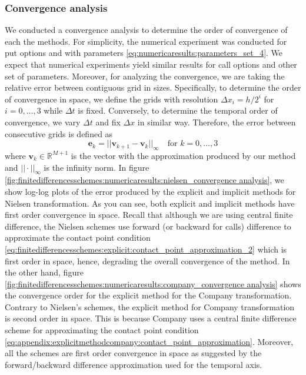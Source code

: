 \subsubsection{Convergence analysis}

We conducted a convergence analysis to determine the order of convergence of each the methods. For simplicity, the numerical experiment was conducted for put options and with parameters \eqref{eq:numericaresults:parameters_set_4}. We expect that numerical experiments yield similar results for call options and other set of parameters. Moreover, for analyzing the convergence, we are taking the relative error between contiguous grid in sizes. Specifically, to determine the order of convergence in space, we define the grids with resolution $\Delta{x}_i=h/2^i$ for $i=0,\dots,3$ while $\Delta{t}$ is fixed. Conversely, to determine the temporal order of convergence, we vary $\Delta{t}$ and fix $\Delta{x}$ in similar way. Therefore, the error between consecutive grids is defined as
\begin{equation}
  \mathbf{e}_k = ||\mathbf{v}_{k+1} - \mathbf{v}_{k}||_{\infty} \quad \text{for $k=0,\dots,3$}
  \label{eq:finitedifferencesschemes:numericalresults:consecutive_error}
\end{equation}
where $\mathbf{v}_{k}\in\mathbb{R}^{M+1}$ is the vector with the approximation produced by our method and $||\cdot||_{\infty}$ is the infinity norm. In figure \eqref{fig:finitedifferencesschemes:numericaresults:nielsen_convergence analysis}, we show log-log plots of the error produced by the explicit and implicit methods for Nielsen transformation. As you can see, both explicit and implicit methods have first order convergence in space. Recall that although we are using central finite difference, the Nielsen schemes use forward (or backward for calls) difference to approximate the contact point condition \eqref{eq:finitedifferencesschemes:explicit:contact_point_approximation_2} which is first order in space, hence, degrading the overall convergence of the method. In the other hand, figure \eqref{fig:finitedifferencesschemes:numericaresults:company_convergence analysis} shows the convergence order for the explicit method for the Company transformation. Contrary to Nielsen's schemes, the explicit method for Company transformation is second order in space. This is because Company uses a central finite difference scheme for approximating the contact point condition \eqref{eq:appendix:explicitmethodcompany:contact_point_approximation}. Moreover, all the schemes are first order convergence in space as suggested by the forward/backward difference approximation used for the temporal axis.
